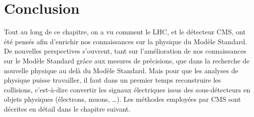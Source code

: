 \section{Conclusion}

Tout au long de ce chapitre, on a vu comment le LHC, et le détecteur CMS, ont été pensés afin d'enrichir nos connaissances sur la physique du Modèle Standard. De nouvelles perspectives s'ouvrent, tant sur l'amélioration de nos connaissances sur le Modèle Standard grâce aux mesures de précisions, que dans la recherche de nouvelle physique au delà du Modèle Standard. Mais pour que les analyses de physique puisse travailler, il faut dans un premier temps reconstruire les collisions, c'est-à-dire convertir les signaux électriques issus des sous-détecteurs en objets physiques (électrons, muons, \dots). Les méthodes employées par CMS sont décrites en détail dans le chapitre suivant.